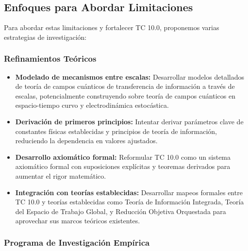 \documentclass[12pt]{article}
\begin{document}
\subsection{Enfoques para Abordar Limitaciones}

Para abordar estas limitaciones y fortalecer TC 10.0, proponemos varias estrategias de investigación:

\subsubsection{Refinamientos Teóricos}

\begin{itemize}
    \item \textbf{Modelado de mecanismos entre escalas:} Desarrollar modelos detallados de teoría de campos cuánticos de transferencia de información a través de escalas, potencialmente construyendo sobre teoría de campos cuánticos en espacio-tiempo curvo y electrodinámica estocástica.
    
    \item \textbf{Derivación de primeros principios:} Intentar derivar parámetros clave de constantes físicas establecidas y principios de teoría de información, reduciendo la dependencia en valores ajustados.
    
    \item \textbf{Desarrollo axiomático formal:} Reformular TC 10.0 como un sistema axiomático formal con suposiciones explícitas y teoremas derivados para aumentar el rigor matemático.
    
    \item \textbf{Integración con teorías establecidas:} Desarrollar mapeos formales entre TC 10.0 y teorías establecidas como Teoría de Información Integrada, Teoría del Espacio de Trabajo Global, y Reducción Objetiva Orquestada para aprovechar sus marcos teóricos existentes.
\end{itemize}

\subsubsection{Programa de Investigación Empírica}
\end{document}
